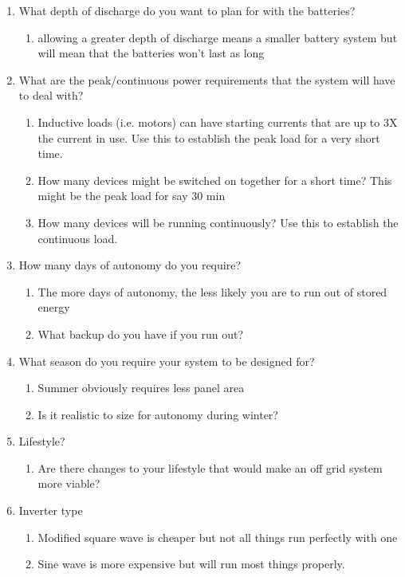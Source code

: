 \documentclass[article]{standalone}
\begin{document}
\begin{enumerate}
\begin{enumerate}
    \end{enumerate}
    \item What depth of discharge do you want to plan for with the batteries?\begin{enumerate}
        \item	allowing a greater depth of discharge means a smaller battery system but will mean that the batteries won’t last as long
    \end{enumerate}
    \item What are the peak/continuous power requirements  that the system will have to deal with?\begin{enumerate}
        \item	Inductive loads (i.e. motors) can have starting currents that are up to 3X the current in use. Use this to establish the peak load for a very short time.
        \item	How many devices might be switched on together for a short time? This might be the peak load for say 30 min
        \item	How many devices will be running continuously? Use this to establish the continuous load.
    \end{enumerate}
    \item How many days of autonomy do you require?\begin{enumerate}
        \item	The more days of autonomy, the less likely you are to run out of stored energy
        \item	What backup do you have if you run out?
    \end{enumerate}
    \item What season do you require your system to be designed for?\begin{enumerate}
        \item	Summer obviously requires less panel area
        \item	Is it realistic to size for autonomy during winter?
    \end{enumerate}
    \item Lifestyle?\begin{enumerate}
        \item 	Are there changes to your lifestyle that would make an off grid system more viable?
    \end{enumerate}
    \item Inverter type\begin{enumerate}
        \item Modified square wave is cheaper but not all things run perfectly with one
        \item	Sine wave is more expensive but will run most things properly.
    \end{enumerate}
\end{enumerate}
\end{document}
